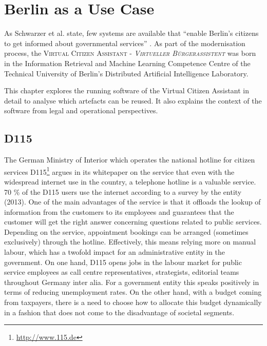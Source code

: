 \chapter{Berlin as a Use Case}
\label{blnusecase}
As Schwarzer et al. state, few systems are available that ``enable Berlin’s citizens to get informed about governmental services'' \cite{lomm:gov}.
As part of the modernisation process, the \textsc{Virtual Citizen Assistant - \emph{Virtueller Bürgerassistent}} was born in %
the Information Retrieval and Machine Learning Competence Centre of the Technical University of Berlin's Distributed Artificial Intelligence Laboratory.

This chapter explores the running software of the Virtual Citizen Assistant in detail to analyse which artefacts can be reused. It also explains the context of the software from legal and operational perspectives.

\section{D115}
\label{d115}
The German Ministry of Interior which operates the national hotline for citizen services D115\footnote{\url{http://www.115.de}} argues in its whitepaper on the service\cite{d115} that even with the widespread internet use in the country, a telephone hotline is a valuable service. 70 \% of the D115 users use the internet according to a survey by the entity (2013). One of the main advantages of the service is that it offloads the lookup of information from the customers to its employees and guarantees that the customer will get the right answer concerning questions related to public services. Depending on the service, appointment bookings can be arranged (sometimes exclusively) through the hotline. Effectively, this means relying more on manual labour, which has a twofold impact for an administrative entity in the government. On one hand, D115 opens jobs in the labour market for public service employees as call centre representatives, strategists, editorial teams throughout Germany inter alia. For a government entity this speaks positively in terms of reducing unemployment rates. On the other hand, with a budget coming from taxpayers, there is a need to choose how to allocate this budget dynamically in a fashion that does not come to the disadvantage of societal segments.

